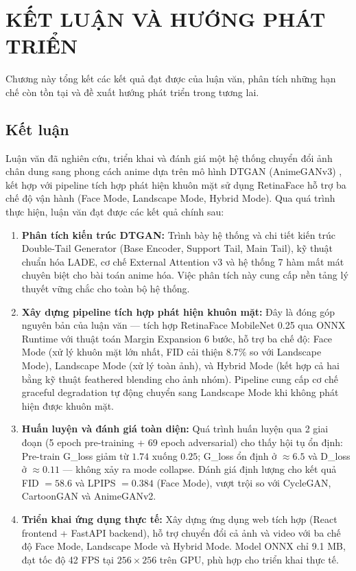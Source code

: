 \clearpage


\setcounter{chapter}{4}
\chapter[{KẾT LUẬN VÀ HƯỚNG PHÁT TRIỂN}]{KẾT LUẬN VÀ HƯỚNG PHÁT TRIỂN}

Chương này tổng kết các kết quả đạt được của luận văn, phân tích những hạn chế còn tồn tại và đề xuất hướng phát triển trong tương lai.

\section{Kết luận}
\label{sec:conclusion}

Luận văn đã nghiên cứu, triển khai và đánh giá một hệ thống chuyển đổi ảnh chân dung sang phong cách anime dựa trên mô hình DTGAN (AnimeGANv3) \cite{Liu2024}, kết hợp với pipeline tích hợp phát hiện khuôn mặt sử dụng RetinaFace \cite{Deng2019RetinaFace} hỗ trợ ba chế độ vận hành (Face Mode, Landscape Mode, Hybrid Mode). Qua quá trình thực hiện, luận văn đạt được các kết quả chính sau:

\begin{enumerate}
    \item \textbf{Phân tích kiến trúc DTGAN:} Trình bày hệ thống và chi tiết kiến trúc Double-Tail Generator (Base Encoder, Support Tail, Main Tail), kỹ thuật chuẩn hóa LADE, cơ chế External Attention v3 và hệ thống 7 hàm mất mát chuyên biệt cho bài toán anime hóa. Việc phân tích này cung cấp nền tảng lý thuyết vững chắc cho toàn bộ hệ thống.

    \item \textbf{Xây dựng pipeline tích hợp phát hiện khuôn mặt:} Đây là đóng góp nguyên bản của luận văn — tích hợp RetinaFace MobileNet 0.25 qua ONNX Runtime với thuật toán Margin Expansion 6 bước, hỗ trợ ba chế độ: Face Mode (xử lý khuôn mặt lớn nhất, FID cải thiện $8.7\%$ so với Landscape Mode), Landscape Mode (xử lý toàn ảnh), và Hybrid Mode (kết hợp cả hai bằng kỹ thuật feathered blending cho ảnh nhóm). Pipeline cung cấp cơ chế graceful degradation tự động chuyển sang Landscape Mode khi không phát hiện được khuôn mặt.

    \item \textbf{Huấn luyện và đánh giá toàn diện:} Quá trình huấn luyện qua 2 giai đoạn (5 epoch pre-training + 69 epoch adversarial) cho thấy hội tụ ổn định: Pre-train G\_loss giảm từ $1.74$ xuống $0.25$; G\_loss ổn định ở $\approx 6.5$ và D\_loss ở $\approx 0.11$ — không xảy ra mode collapse. Đánh giá định lượng cho kết quả FID $= 58.6$ và LPIPS $= 0.384$ (Face Mode), vượt trội so với CycleGAN, CartoonGAN và AnimeGANv2.

    \item \textbf{Triển khai ứng dụng thực tế:} Xây dựng ứng dụng web tích hợp (React frontend + FastAPI backend), hỗ trợ chuyển đổi cả ảnh và video với ba chế độ Face Mode, Landscape Mode và Hybrid Mode. Model ONNX chỉ 9.1 MB, đạt tốc độ 42 FPS tại $256 \times 256$ trên GPU, phù hợp cho triển khai thực tế.
\end{enumerate}

